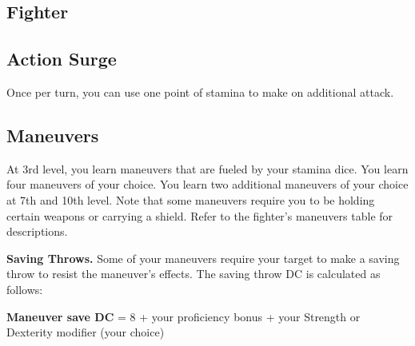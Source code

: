 
\begin{multicols*}{2}

\section{Fighter}

\subsection*{Action Surge}

Once per turn, you can use one point of stamina to make on additional attack.



\subsection*{Maneuvers}

At 3rd level, you learn maneuvers that are fueled by your stamina dice.
You learn four maneuvers of your choice. You learn two additional maneuvers of your choice at 7th and 10th level. Note that some maneuvers require you to be holding certain weapons or carrying a shield. Refer to the  fighter's maneuvers table for descriptions.

\textbf{Saving Throws.} Some of your maneuvers require your target to make a saving throw to resist the maneuver's effects. The saving throw DC is calculated as follows:

\textbf{Maneuver save DC} = 8 + your proficiency bonus + your Strength or Dexterity modifier (your choice)


\end{multicols*}
